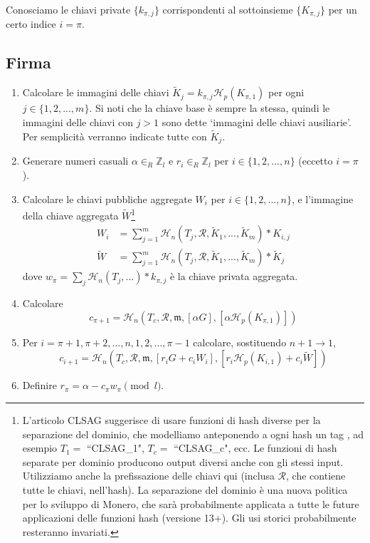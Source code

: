 Conosciamo le chiavi private \(\{k_{\pi, j}\}\) corrispondenti al sottoinsieme \(\{K_{\pi, j}\}\) per un certo indice \(i = \pi\).


\subsection*{Firma}

\begin{enumerate}
	\item Calcolare le immagini delle chiavi \(\tilde{K}_j = k_{\pi, j} \mathcal{H}_p(K_{\pi, 1})\) per ogni \(j \in \{1, 2, ..., m\}\). Si noti che la chiave base è sempre la stessa, quindi le immagini delle chiavi con \(j > 1\) sono dette `immagini delle chiavi ausiliarie'. Per semplicità verranno indicate tutte con \(\tilde{K}_j\).

	\item Generare numeri casuali \(\alpha \in_R \mathbb{Z}_l\) e \(r_i \in_R \mathbb{Z}_l\) per \(i \in \{1, 2, ..., n\}\) (eccetto \(i = \pi\)).

    \item Calcolare le chiavi pubbliche aggregate \(W_i\) per \(i \in \{1, 2, ..., n\}\), e l'immagine della chiave aggregata \(\tilde{W}\)\footnote{L'articolo CLSAG suggerisce di usare funzioni di hash diverse per la separazione del dominio, che modelliamo anteponendo a ogni hash un tag \cite{MRL-0011-CLSAG}, ad esempio \(T_1 =\) ``CLSAG\_1", \(T_c =\) ``CLSAG\_c", ecc. Le funzioni di hash separate per dominio producono output diversi anche con gli stessi input. Utilizziamo anche la prefissazione delle chiavi qui (inclusa \(\mathcal{R}\), che contiene tutte le chiavi, nell'hash). La separazione del dominio è una nuova politica per lo sviluppo di Monero, che sarà probabilmente applicata a tutte le future applicazioni delle funzioni hash (versione 13+). Gli usi storici probabilmente resteranno invariati.}
    \begin{align*}
    W_i &= \sum^{m}_{j=1} \mathcal{H}_n(T_j, \mathcal{R}, \tilde{K}_1,...,\tilde{K}_m) * K_{i,j}\\
    \tilde{W} &= \sum^{m}_{j=1} \mathcal{H}_n(T_j, \mathcal{R}, \tilde{K}_1,...,\tilde{K}_m) * \tilde{K}_j
    \end{align*}
    dove \(w_{\pi} = \sum_j \mathcal{H}_n(T_j, ...)*k_{\pi,j}\) è la chiave privata aggregata.

	\item Calcolare
	\[c_{\pi+1} = \mathcal{H}_n(T_c, \mathcal{R}, \mathfrak{m}, [\alpha G], [\alpha \mathcal{H}_p(K_{\pi, 1})])\]

	\item Per \(i = \pi+1, \pi+2, ..., n, 1, 2, ..., \pi-1\) calcolare, sostituendo \(n+1 \rightarrow 1\),\vspace{.175cm}
	\[c_{i+1} = \mathcal{H}_n(T_c, \mathcal{R}, \mathfrak{m}, [r_i G + c_i W_i], [r_i \mathcal{H}_p(K_{i,1}) + c_i \tilde{W}])\]

	\item Definire \(r_{\pi} = \alpha - c_{\pi} w_{\pi} \pmod l\).
\end{enumerate}

